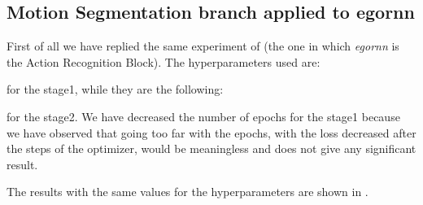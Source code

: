 \documentclass[10pt,twocolumn,hidelinks,letterpaper]{article}
\begin{document}
\subsection{Motion Segmentation branch applied to egornn}

First of all we have replied the same experiment of \cite{sparnet} (the one in which \textit{egornn} is the Action Recognition Block). The hyperparameters used are:

\begin{center}
\end{center}

for the stage1, while they are the following:

\begin{center}
\end{center}

for the stage2. We have decreased the number of epochs for the stage1 because we have observed that going too far with the epochs, with the loss decreased after the steps of the optimizer, would be meaningless and does not give any significant result.

The results with the same values for the hyperparameters are shown in .
\end{document}
